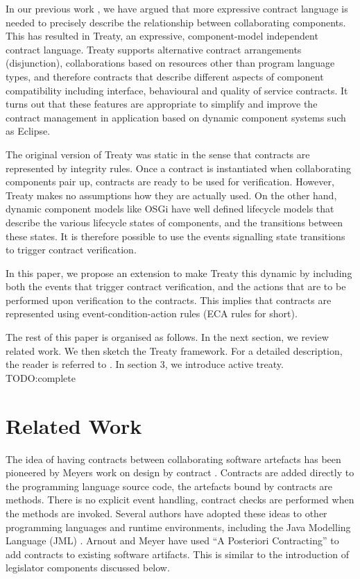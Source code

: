 \documentclass{llncs}
\begin{document}
In our previous work \cite{Treaty.JOT2009}, we have argued that more expressive contract language is needed to precisely describe the relationship between collaborating components. This has resulted in Treaty, an expressive, component-model independent contract language. Treaty supports alternative contract arrangements (disjunction), collaborations based on resources other than program language types, and therefore contracts that describe different aspects of component compatibility \cite{BeugnardEtAl99} including interface, behavioural and quality of service contracts. It turns out that these features are appropriate to simplify and improve the contract management in application based on dynamic component systems such as Eclipse. 

The original version of Treaty was static in the sense that contracts are represented by integrity rules. Once a contract is instantiated when collaborating components pair up, contracts are ready to be used for verification. However, Treaty makes no assumptions how they are actually used. On the other hand, dynamic component models like OSGi have well defined lifecycle models that describe the various lifecycle states of components, and the transitions between these states. It is therefore possible to use the events signalling state transitions to trigger contract verification. 

In this paper, we propose an extension to make Treaty this dynamic by including both the events that trigger contract verification, and the actions that are to be performed upon verification  to the contracts. This implies that contracts are represented using event-condition-action rules (ECA rules for short). 

The rest of this paper is organised as follows. In the next section, we review related work. We then sketch the Treaty framework. For a detailed description, the reader is referred to \cite{Treaty.JOT2009}. In section 3, we introduce active treaty. TODO:complete 



\section{Related Work}


The idea of having contracts between collaborating software artefacts has been pioneered by Meyers work on design by contract \cite{DesignByContract}. Contracts are added directly to the programming language source code, the 
artefacts bound by contracts are methods. There is no explicit event handling, contract checks are performed when the methods are invoked. Several authors have adopted these ideas to other programming languages and runtime
environments, including the Java Modelling Language (JML) \cite{DBLP:conf/fmco/ChalinKLP05}. Arnout and Meyer  \cite{ArnoutMeyer2003b} have used ``A Posteriori Contracting'' to add contracts to existing software artifacts. This is similar to the introduction of legislator components discussed below.   
\end{document}
